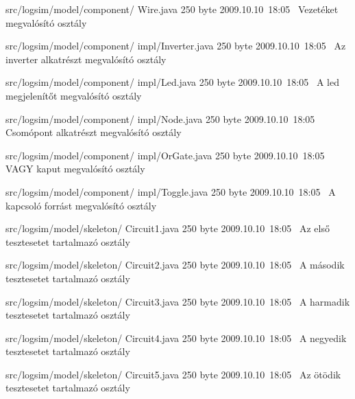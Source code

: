 \begin{fajllista}
\fajl
{src/logsim/model/component/\newline
Wire.java} %
{250 byte} %
{2009.10.10~18:05~} %
{Vezetéket megvalósító osztály} %

\fajl
{src/logsim/model/component/\newline
impl/Inverter.java} %
{250 byte} %
{2009.10.10~18:05~} %
{Az inverter alkatrészt megvalósító osztály} %

\fajl
{src/logsim/model/component/\newline
impl/Led.java} %
{250 byte} %
{2009.10.10~18:05~} %
{A led megjelenítőt megvalósító osztály} %

\fajl
{src/logsim/model/component/\newline
impl/Node.java} %
{250 byte} %
{2009.10.10~18:05~} %
{Csomópont alkatrészt megvalósító osztály} %

\fajl
{src/logsim/model/component/\newline
impl/OrGate.java} %
{250 byte} %
{2009.10.10~18:05~} %
{VAGY kaput megvalósító osztály} %

\fajl
{src/logsim/model/component/\newline
impl/Toggle.java} %
{250 byte} %
{2009.10.10~18:05~} %
{A kapcsoló forrást megvalósító osztály} %

\fajl
{src/logsim/model/skeleton/\newline
Circuit1.java} %
{250 byte} %
{2009.10.10~18:05~} %
{Az első tesztesetet tartalmazó osztály} %

\fajl
{src/logsim/model/skeleton/\newline
Circuit2.java} %
{250 byte} %
{2009.10.10~18:05~} %
{A második tesztesetet tartalmazó osztály} %

\fajl
{src/logsim/model/skeleton/\newline
Circuit3.java} %
{250 byte} %
{2009.10.10~18:05~} %
{A harmadik tesztesetet tartalmazó osztály} %

\fajl
{src/logsim/model/skeleton/\newline
Circuit4.java} %
{250 byte} %
{2009.10.10~18:05~} %
{A negyedik tesztesetet tartalmazó osztály} %

\fajl
{src/logsim/model/skeleton/\newline
Circuit5.java} %
{250 byte} %
{2009.10.10~18:05~} %
{Az ötödik tesztesetet tartalmazó osztály} %

\end{fajllista}

